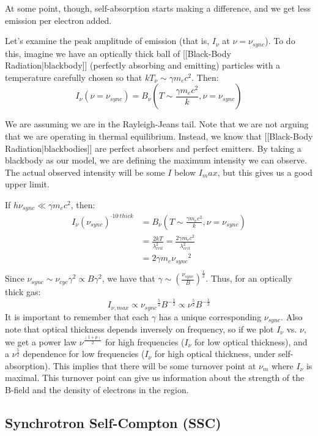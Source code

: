 \documentclass{article}
\def\hf{\frac12}
\def\e#1{\cdot10^{#1}}
\def\hf{\frac12}
\begin{document}
At some point, though, self-absorption starts making a difference, and we
get less emission per electron added.

Let's examine the 
peak amplitude of emission (that is, $I_\nu$ at $\nu=\nu_{sync}$).  
To do this,
imagine we have an optically thick ball of [[Black-Body Radiation|blackbody]] (perfectly absorbing 
and emitting) particles
with a temperature carefully chosen so that $kT_{\nu}\sim\gamma m_e c^2$. Then:
\def\nucrit{{\nu_{sync}}}
$$I_\nu(\nu=\nucrit)=B_\nu(T\sim\frac{\gamma m_ec^2}{ k},\nu=\nucrit)$$

We are assuming we are in the Rayleigh-Jeans tail. Note that we are not arguing that we are operating in thermal equilibrium. Instead, we know that [[Black-Body Radiation|blackbodies]] are perfect absorbers and perfect emitters. By taking a blackbody as our model, we are defining the maximum intensity we can observe. The actual observed intensity will be some $I$ below $I_max$, but this gives us a good upper limit.

If $h\nucrit\ll\gamma m_ec^2$, then:
$$\begin{aligned}I_\nu(\nucrit)^{\e,thick}
&=B_\nu(T\sim\frac{\gamma m_ec^2}{ k},\nu=\nucrit)\\ 
&=\frac{2kT}{\lambda_{crit}^2}=\frac{2\gamma m_ec^2}{\lambda_{crit}^2}\\ 
&=2\gamma m_e\nucrit^2\\ \end{aligned}$$
Since $\nucrit\sim\nu_{cyc}\gamma^2\propto B\gamma^2$, we have that
$\gamma\sim\left(\frac{\nucrit}{ B}\right)^\hf$.  Thus, for an optically
thick gas:
$$I_{\nu,max}\propto\nucrit^\frac{5}{2}B^{-\hf}\propto\nu^\frac{5}{2}B^{-\hf}$$
It is important to remember that each $\gamma$ has a unique corresponding
$\nucrit$.  Also note that optical thickness depends inversely on frequency,
so if we plot $I_\nu$ vs. $\nu$, we get a power law $\nu^\frac{(1+p)}{2}$ for
high frequencies ($I_\nu$ for low optical thickness), and a $\nu^\frac{5}{2}$ dependence
for low frequencies ($I_\nu$ for high optical thickness, under self-absorption).  This implies that there will be some turnover point at $\nu_m$ where $I_\nu$ is maximal. This turnover point can give us information about the strength of the B-field and the density of electrons in the region.

\subsection{ Synchrotron Self-Compton (SSC)}
\end{document}
